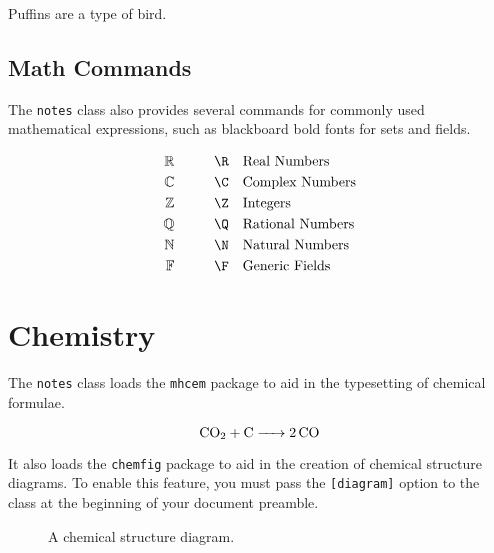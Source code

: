 \documentclass[diagram]{notes}
\begin{document}
\begin{example}
Puffins are a type of bird.
\end{example}

\subsection{Math Commands}

The \texttt{notes} class also provides several commands for commonly used mathematical expressions, such as blackboard bold fonts for sets and fields.

\begin{align*}  
	\R \hspace*{1cm} & \texttt{\string\R} && \text{Real Numbers} \\
	\C \hspace*{1cm} & \texttt{\string\C} && \text{Complex Numbers} \\
	\Z \hspace*{1cm} & \texttt{\string\Z} && \text{Integers} \\
	\Q \hspace*{1cm} & \texttt{\string\Q} && \text{Rational Numbers} \\
	\N \hspace*{1cm} & \texttt{\string\N} && \text{Natural Numbers} \\
	\F \hspace*{1cm} & \texttt{\string\F} && \text{Generic Fields}
\end{align*} 

\section{Chemistry}
The \texttt{notes} class loads the \verb|mhcem| package to aid in the typesetting of chemical formulae.

\[ \ce{CO2 + C -> 2 CO} \]

It also loads the \verb|chemfig| package to aid in the creation of chemical structure diagrams. To enable this feature, you must pass the \verb|[diagram]| option to the class at the beginning of your document preamble.

\begin{figure}[h]
	\centering
	\setcrambond{2pt}{}{}
	  \caption{A chemical structure diagram.}
\end{figure}
\end{document}
